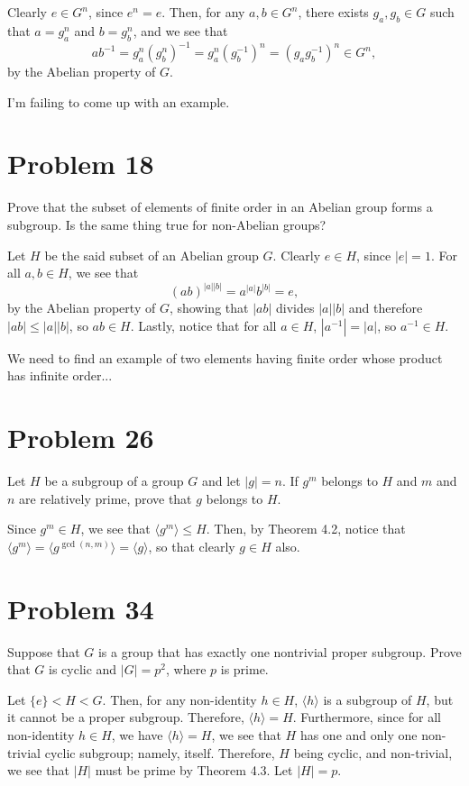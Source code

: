 \documentclass[12pt]{article}
\begin{document}
Clearly $e\in G^n$, since $e^n=e$.  Then, for any $a,b\in G^n$, there exists
$g_a,g_b\in G$ such that $a=g_a^n$ and $b=g_b^n$, and we see that
\begin{equation*}
ab^{-1} = g_a^n(g_b^n)^{-1} = g_a^n(g_b^{-1})^n = (g_ag_b^{-1})^n \in G^n,
\end{equation*}
by the Abelian property of $G$.

I'm failing to come up with an example.

\section*{Problem 18}

Prove that the subset of elements of finite order in an Abelian group forms
a subgroup.  Is the same thing true for non-Abelian groups?

Let $H$ be the said subset of an Abelian group $G$.  Clearly $e\in H$, since $|e|=1$.
For all $a,b\in H$, we see that
\begin{equation*}
(ab)^{|a||b|}=a^{|a|}b^{|b|}=e,
\end{equation*}
by the Abelian property of $G$,
showing that $|ab|$ divides $|a||b|$ and
therefore $|ab|\leq |a||b|$, so $ab\in H$.
Lastly, notice that for all $a\in H$, $|a^{-1}|=|a|$,
so $a^{-1}\in H$.

We need to find an example of two elements having finite
order whose product has infinite order...

\section*{Problem 26}

Let $H$ be a subgroup of a group $G$ and let $|g|=n$.  If $g^m$ belongs to $H$
and $m$ and $n$ are relatively prime, prove that $g$ belongs to $H$.

Since $g^m\in H$, we see that $\langle g^m\rangle\leq H$.
Then, by Theorem 4.2, notice that $\langle g^m\rangle=\langle g^{\gcd(n,m)}\rangle=\langle g\rangle$,
so that clearly $g\in H$ also.

\section*{Problem 34}

Suppose that $G$ is a group that has exactly one nontrivial proper subgroup.
Prove that $G$ is cyclic and $|G|=p^2$, where $p$ is prime.

Let $\{e\}<H<G$.  Then, for any non-identity $h\in H$, $\langle h\rangle$ is a subgroup of $H$,
but it cannot be a proper subgroup.  Therefore, $\langle h\rangle=H$.  Furthermore,
since for all non-identity $h\in H$, we have $\langle h\rangle = H$, we see that $H$ has one and
only one non-trivial cyclic subgroup; namely, itself.  Therefore, $H$ being cyclic, and non-trivial, we
see that $|H|$ must be prime by Theorem 4.3.  Let $|H|=p$.
\end{document}
